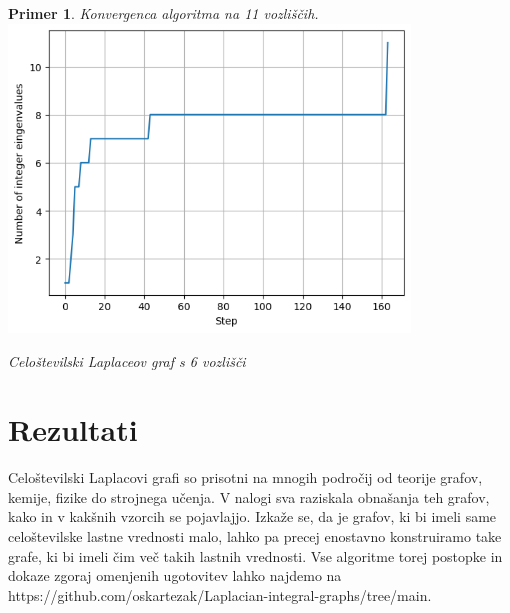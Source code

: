 \documentclass{article}
\newtheorem{primer}{Primer}
\begin{document}
\newpage

\begin{primer}
    Konvergenca algoritma na 11 vozliščih. \\
            \centering
            \includegraphics[width=0.8\textwidth]{primer7.png}
            \caption{Celoštevilski Laplaceov graf s 6 vozlišči}
           
       
    \end{primer}


\section{Rezultati}

Celoštevilski Laplacovi grafi so prisotni na mnogih področij od teorije grafov, kemije, fizike do strojnega učenja.
V nalogi sva raziskala obnašanja teh grafov, kako in v kakšnih vzorcih se pojavlajjo.
Izkaže se, da je grafov, ki bi imeli same celoštevilske lastne vrednosti malo, lahko pa precej enostavno konstruiramo
take grafe, ki bi imeli čim več takih lastnih vrednosti. Vse algoritme torej postopke in dokaze zgoraj omenjenih ugotovitev 
lahko najdemo na https://github.com/oskartezak/Laplacian-integral-graphs/tree/main.
\end{document}
